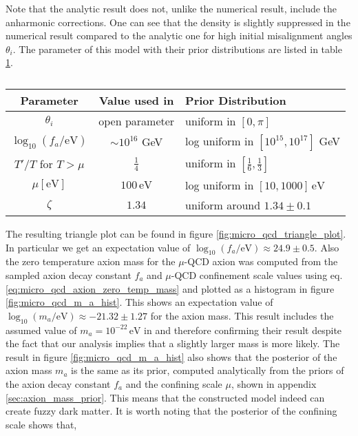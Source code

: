 \documentclass[twoside,a4paper, 12pt]{article}
\numberwithin{equation}{section}
\begin{document}
Note that the analytic result does not, unlike the numerical result, include the anharmonic corrections. One can see that the density is slightly suppressed in the numerical result compared to
the analytic one for high initial misalignment angles $\theta_i$.
The parameter of this model with their prior distributions are listed in table \ref{tab:micro_qcd_parameter_table}.
\begin{table}[H]
    \centering
    \caption{}
    \begin{tabular}{c|c|l}
        Parameter & Value used in \cite{microqcd} & Prior Distribution \\
        \hline
        $\theta_i$ & open parameter & uniform in $[0, \pi]$ \\
        $\log_{10} (f_a / \mathrm{eV})$ & $\sim 10^{16}$ GeV & log uniform in $[10^{15}, 10^{17}]$ GeV \\
        $T' / T$ for $T > \mu$ & $\frac{1}{4}$ & uniform in $[\frac{1}{6}, \frac{1}{3}]$ \\
        $\mu [\mathrm{eV}]$ & $100 \, \mathrm{eV}$ & log uniform in $[10, 1000] \, \mathrm{eV}$\\
        $\zeta$ & $1.34$ & uniform around $1.34 \pm 0.1$
    \end{tabular}
    \label{tab:micro_qcd_parameter_table}
\end{table}
The resulting triangle plot can be found in figure \ref{fig:micro_qcd_triangle_plot}.
In particular we get an expectation value of $\log_{10} (f_a / \mathrm{eV}) \approx 24.9 \pm 0.5$.
Also the zero temperature axion mass for the $\mu$-QCD axion was computed from the sampled 
axion decay constant $f_a$ and $\mu$-QCD confinement scale values using eq. \eqref{eq:micro_qcd_axion_zero_temp_mass}
and plotted as a histogram in figure \ref{fig:micro_qcd_m_a_hist}.
This shows an expectation value of $\log_{10} (m_a / \mathrm{eV}) \approx -21.32 \pm 1.27$
for the axion mass.
This result includes the assumed value of $m_a = 10^{-22} \, \mathrm{eV}$ in \cite{microqcd}
and therefore confirming their result despite the fact that our analysis implies that a slightly larger mass
is more likely.
The result in figure \ref{fig:micro_qcd_m_a_hist} also shows that the posterior of the
axion mass $m_a$ is the same as its prior, computed analytically from the priors of the axion decay constant $f_a$
and the confining scale $\mu$, shown in appendix \ref{sec:axion_mass_prior}.
This means that the constructed model indeed can create fuzzy dark matter.
It is worth noting that the posterior of the confining scale shows that, 
\end{document}
